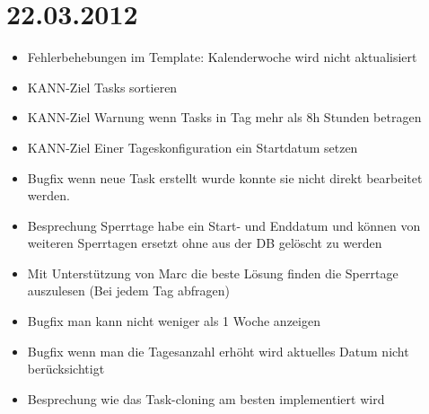 \section{22.03.2012}
    \begin{itemize}
        \item Fehlerbehebungen im Template: Kalenderwoche wird nicht aktualisiert
        \item KANN-Ziel Tasks sortieren
        \item KANN-Ziel Warnung wenn Tasks in Tag mehr als 8h Stunden betragen
        \item KANN-Ziel Einer Tageskonfiguration ein Startdatum setzen
        \item Bugfix wenn neue Task erstellt wurde konnte sie nicht direkt bearbeitet werden.
        \item Besprechung Sperrtage habe ein Start- und Enddatum und können von weiteren Sperrtagen ersetzt ohne aus der DB gelöscht zu werden
        \item Mit Unterstützung von Marc die beste Lösung finden die Sperrtage auszulesen (Bei jedem Tag abfragen)
        \item Bugfix man kann nicht weniger als 1 Woche anzeigen
        \item Bugfix wenn man die Tagesanzahl erhöht wird aktuelles Datum nicht berücksichtigt
        \item Besprechung wie das Task-cloning am besten implementiert wird
    \end{itemize}
